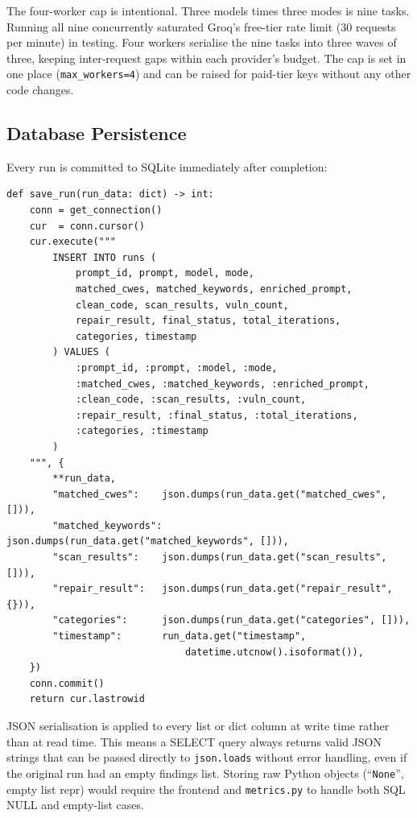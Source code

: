 \documentclass[12pt,a4paper]{report}
\begin{document}
The four-worker cap is intentional. Three models times three modes is nine
tasks. Running all nine concurrently saturated Groq's free-tier rate limit
(30 requests per minute) in testing. Four workers serialise the nine tasks
into three waves of three, keeping inter-request gaps within each provider's
budget. The cap is set in one place (\texttt{max\_workers=4}) and can be
raised for paid-tier keys without any other code changes.

\subsection{Database Persistence}

Every run is committed to SQLite immediately after completion:

\begin{lstlisting}[caption={\texttt{save\_run} in \texttt{database.py}},
                   label={lst:saverun}]
def save_run(run_data: dict) -> int:
    conn = get_connection()
    cur  = conn.cursor()
    cur.execute("""
        INSERT INTO runs (
            prompt_id, prompt, model, mode,
            matched_cwes, matched_keywords, enriched_prompt,
            clean_code, scan_results, vuln_count,
            repair_result, final_status, total_iterations,
            categories, timestamp
        ) VALUES (
            :prompt_id, :prompt, :model, :mode,
            :matched_cwes, :matched_keywords, :enriched_prompt,
            :clean_code, :scan_results, :vuln_count,
            :repair_result, :final_status, :total_iterations,
            :categories, :timestamp
        )
    """, {
        **run_data,
        "matched_cwes":    json.dumps(run_data.get("matched_cwes", [])),
        "matched_keywords": json.dumps(run_data.get("matched_keywords", [])),
        "scan_results":    json.dumps(run_data.get("scan_results", [])),
        "repair_result":   json.dumps(run_data.get("repair_result", {})),
        "categories":      json.dumps(run_data.get("categories", [])),
        "timestamp":       run_data.get("timestamp",
                               datetime.utcnow().isoformat()),
    })
    conn.commit()
    return cur.lastrowid
\end{lstlisting}

JSON serialisation is applied to every list or dict column at write time rather
than at read time. This means a SELECT query always returns valid JSON strings
that can be passed directly to \texttt{json.loads} without error handling, even
if the original run had an empty findings list. Storing raw Python objects
(``\texttt{None}'', empty list repr) would require the frontend and
\texttt{metrics.py} to handle both SQL NULL and empty-list cases.
\end{document}
